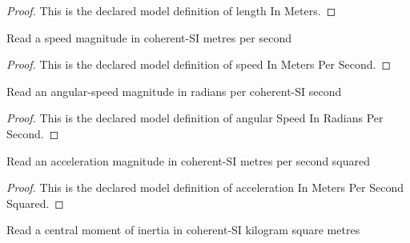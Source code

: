 \begin{proof}
  This is the declared model definition of length In Meters.
\end{proof}
\begin{definition}
  \label{def:physics:phyx-mini-0789:phyxminiproblems-problemphyxmini0789-speedinmeterspersecond}
  Read a speed magnitude in coherent-SI metres per second
\end{definition}
\begin{proof}
  This is the declared model definition of speed In Meters Per Second.
\end{proof}
\begin{definition}
  \label{def:physics:phyx-mini-0789:phyxminiproblems-problemphyxmini0789-angularspeedinradianspersecond}
  Read an angular-speed magnitude in radians per coherent-SI second
\end{definition}
\begin{proof}
  This is the declared model definition of angular Speed In Radians Per Second.
\end{proof}
\begin{definition}
  \label{def:physics:phyx-mini-0789:phyxminiproblems-problemphyxmini0789-accelerationinmeterspersecondsquared}
  Read an acceleration magnitude in coherent-SI metres per second squared
\end{definition}
\begin{proof}
  This is the declared model definition of acceleration In Meters Per Second Squared.
\end{proof}
\begin{definition}
  \label{def:physics:phyx-mini-0789:phyxminiproblems-problemphyxmini0789-momentofinertiainkilogramsquaremeters}
  Read a central moment of inertia in coherent-SI kilogram square metres
\end{definition}
